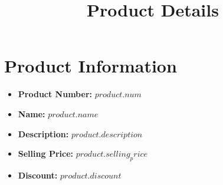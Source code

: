 \documentclass[12pt]{article}
\begin{document}
\title{Product Details}
\author{}
\date{}
\maketitle

\section*{Product Information}

\begin{itemize}
    \item \textbf{\large Product Number:} ${{ product.num }}$
    \item \textbf{\large Name:} ${{ product.name }}$
    \item \textbf{\large Description:} ${{ product.description }}$
    \item \textbf{\large Selling Price:} ${{ product.selling_price }}$
    \item \textbf{\large Discount:} ${{ product.discount }}$
\end{itemize}
\end{document}
